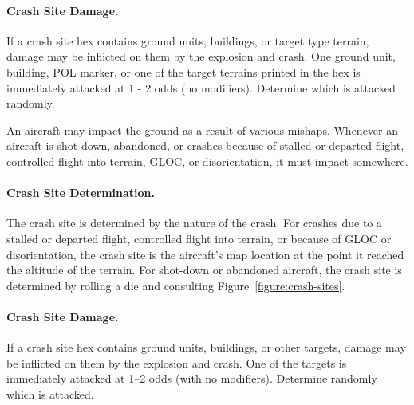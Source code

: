 \begin{advancedrules}
{\paragraph{Crash Site Damage.} If a crash site hex contains ground units, buildings, or target type terrain, damage may be inflicted on them by the explosion and crash. One ground unit, building, POL marker, or one of the target terrains printed in the hex is immediately attacked at 1 - 2 odds (no modifiers). Determine which is attacked randomly.

}{
An aircraft may impact the ground as a result of various mishaps. Whenever an aircraft is shot down, abandoned, or crashes because of stalled or departed flight, controlled flight into terrain, GLOC, or disorientation, it must impact somewhere.

\paragraph{Crash Site Determination.} The crash site is determined by the nature of the crash. For crashes due to a stalled or departed flight, controlled flight into terrain, or because of GLOC or disorientation, the crash site is the aircraft's  map location at the point it reached the altitude of the terrain. For shot-down or abandoned aircraft, the crash site is determined by rolling a die and consulting Figure~\ref{figure:crash-sites}.

\paragraph{Crash Site Damage.} If a crash site hex contains ground units, buildings, or other targets, damage may be inflicted on them by the explosion and crash. One of the targets is immediately attacked at 1--2 odds (with no modifiers). Determine randomly which is attacked.
}

\end{advancedrules}
